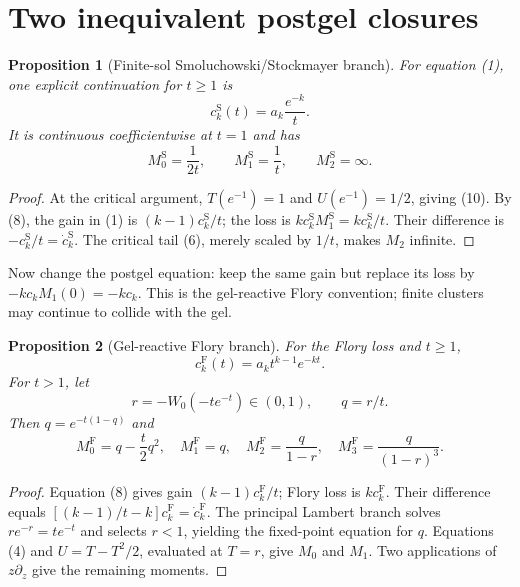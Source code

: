\documentclass[11pt]{article}
\newtheorem{proposition}{Proposition}
\begin{document}
\section{Two inequivalent postgel closures}
\begin{proposition}[Finite-sol Smoluchowski/Stockmayer branch]\label{prop:s}
For equation (1), one explicit continuation for $t\ge1$ is
\begin{equation}
 c_k^{\mathrm S}(t)=a_k\frac{e^{-k}}t.                 \tag{9}
\end{equation}
It is continuous coefficientwise at $t=1$ and has
\begin{equation}
 M_0^{\mathrm S}=\frac1{2t},\qquad
 M_1^{\mathrm S}=\frac1t,\qquad M_2^{\mathrm S}=\infty. \tag{10}
\end{equation}
\end{proposition}

\begin{proof}
At the critical argument, $T(e^{-1})=1$ and $U(e^{-1})=1/2$, giving (10).
By (8), the gain in (1) is $(k-1)c_k^{\mathrm S}/t$; the loss is
$kc_k^{\mathrm S}M_1^{\mathrm S}=kc_k^{\mathrm S}/t$.
Their difference is $-c_k^{\mathrm S}/t=\dot c_k^{\mathrm S}$.  The critical
tail (6), merely scaled by $1/t$, makes $M_2$ infinite.
\end{proof}

Now change the postgel equation: keep the same gain but replace its loss by
$-kc_kM_1(0)=-kc_k$.  This is the gel-reactive Flory convention; finite
clusters may continue to collide with the gel.

\begin{proposition}[Gel-reactive Flory branch]\label{prop:f}
For the Flory loss and $t\ge1$,
\begin{equation}
 c_k^{\mathrm F}(t)=a_kt^{k-1}e^{-kt}.                 \tag{11}
\end{equation}
For $t>1$, let
\begin{equation}
 r=-W_0(-te^{-t})\in(0,1),\qquad q=r/t.                \tag{12}
\end{equation}
Then $q=e^{-t(1-q)}$ and
\begin{equation}
 M_0^{\mathrm F}=q-\frac t2q^2,\quad M_1^{\mathrm F}=q,\quad
 M_2^{\mathrm F}=\frac q{1-r},\quad
 M_3^{\mathrm F}=\frac q{(1-r)^3}.                    \tag{13}
\end{equation}
\end{proposition}

\begin{proof}
Equation (8) gives gain $(k-1)c_k^{\mathrm F}/t$; Flory loss is
$kc_k^{\mathrm F}$.  Their difference equals
$[(k-1)/t-k]c_k^{\mathrm F}=\dot c_k^{\mathrm F}$.  The principal Lambert
branch solves $re^{-r}=te^{-t}$ and selects $r<1$, yielding the fixed-point
equation for $q$.  Equations (4) and $U=T-T^2/2$, evaluated at $T=r$, give
$M_0$ and $M_1$.  Two applications of $z\partial_z$ give the remaining
moments.
\end{proof}
\end{document}
